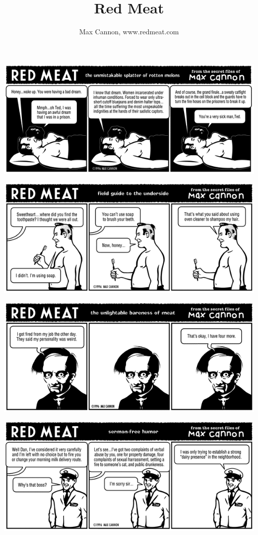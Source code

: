 \documentclass[a4paper,twoside,11pt]{article}
\title{Red Meat}
\author{Max Cannon, www.redmeat.com}
\begin{document}
\maketitle



\includegraphics[width=\textwidth]{redmeat_1996-06-10.png}



\includegraphics[width=\textwidth]{redmeat_1996-06-17.png}



\includegraphics[width=\textwidth]{redmeat_1996-06-24.png}



\includegraphics[width=\textwidth]{redmeat_1996-07-01.png}
\end{document}
